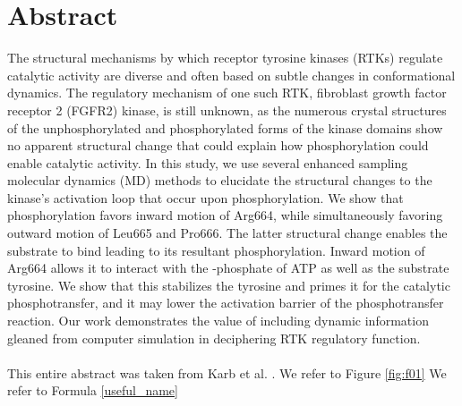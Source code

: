 \chapter*{Abstract}
The structural mechanisms by which receptor tyrosine kinases (RTKs) regulate catalytic activity are diverse and often based on subtle changes in conformational dynamics. The regulatory mechanism of one such RTK, fibroblast growth factor receptor 2 (FGFR2) kinase, is still unknown, as the numerous crystal structures of the unphosphorylated and phosphorylated forms of the kinase domains show no apparent structural change that could explain how phosphorylation could enable catalytic activity. In this study, we use several enhanced sampling molecular dynamics (MD) methods to elucidate the structural changes to the kinase’s activation loop that occur upon phosphorylation. We show that phosphorylation favors inward motion of Arg664, while simultaneously favoring outward motion of Leu665 and Pro666. The latter structural change enables the substrate to bind leading to its resultant phosphorylation. Inward motion of Arg664 allows it to interact with the \textgamma-phosphate of ATP as well as the substrate tyrosine. We show that this stabilizes the tyrosine and primes it for the catalytic phosphotransfer, and it may lower the activation barrier of the phosphotransfer reaction. Our work demonstrates the value of including dynamic information gleaned from computer simulation in deciphering RTK regulatory function.\\ \\
This entire abstract was taken from Karb et al. \cite{Karp2017}.
We refer to Figure \ref{fig:f01}
We refer to Formula \ref{useful_name}